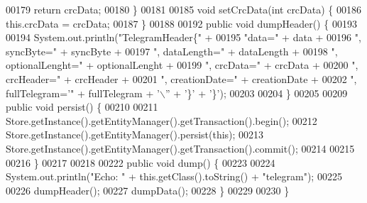 \begin{DoxyCode}
00179         \textcolor{keywordflow}{return} crcData;
00180     \}
00181 
00185     \textcolor{keywordtype}{void} setCrcData(\textcolor{keywordtype}{int} crcData) \{
00186         this.crcData = crcData;
00187     \}
00188 
00192     \textcolor{keyword}{public} \textcolor{keywordtype}{void} dumpHeader() \{
00193 
00194         System.out.println(\textcolor{stringliteral}{"TelegramHeader\{"} +
00195                 \textcolor{stringliteral}{"data="} + data +
00196                 \textcolor{stringliteral}{", syncByte="} + syncByte +
00197                 \textcolor{stringliteral}{", dataLength="} + dataLength +
00198                 \textcolor{stringliteral}{", optionalLenght="} + optionalLenght +
00199                 \textcolor{stringliteral}{", crcData="} + crcData +
00200                 \textcolor{stringliteral}{", crcHeader="} + crcHeader +
00201                 \textcolor{stringliteral}{", creationDate="} + creationDate +
00202                 \textcolor{stringliteral}{", fullTelegram='"} + fullTelegram + \textcolor{charliteral}{'\(\backslash\)''} + \textcolor{charliteral}{'\}'} + \textcolor{charliteral}{'\}'});
00203 
00204     \}
00205 
00209     \textcolor{keyword}{public} \textcolor{keywordtype}{void} persist() \{
00210 
00211         Store.getInstance().getEntityManager().getTransaction().begin();
00212         Store.getInstance().getEntityManager().persist(\textcolor{keyword}{this});
00213         Store.getInstance().getEntityManager().getTransaction().commit();
00214 
00215 
00216     \}
00217 
00218 
00222     \textcolor{keyword}{public} \textcolor{keywordtype}{void} dump() \{
00223 
00224         System.out.println(\textcolor{stringliteral}{"Echo: "} + this.getClass().toString() + \textcolor{stringliteral}{"telegram"});
00225 
00226         dumpHeader();
00227         dumpData();
00228     \}
00229 
00230 \}
\end{DoxyCode}
